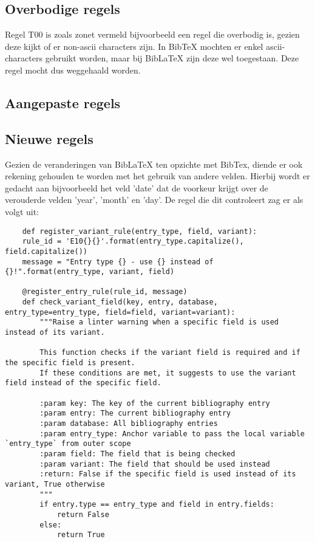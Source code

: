 \subsection{Overbodige regels}
Regel T00 is zoals zonet vermeld bijvoorbeeld een regel die overbodig is, gezien deze kijkt of er non-ascii characters zijn. In BibTeX mochten er enkel ascii-characters gebruikt worden, maar bij BibLaTeX zijn deze wel toegestaan. Deze regel mocht dus weggehaald worden.


\subsection{Aangepaste regels}

\subsection{Nieuwe regels}
Gezien de veranderingen van BibLaTeX ten opzichte met BibTex, diende er ook rekening gehouden te worden met het gebruik van andere velden. Hierbij wordt er gedacht aan bijvoorbeeld het veld 'date' dat de voorkeur krijgt over de verouderde velden 'year', 'month' en 'day'.
De regel die dit controleert zag er als volgt uit:
\begin{verbatim}
    def register_variant_rule(entry_type, field, variant):
    rule_id = 'E10{}{}'.format(entry_type.capitalize(), field.capitalize())
    message = "Entry type {} - use {} instead of {}!".format(entry_type, variant, field)

    @register_entry_rule(rule_id, message)
    def check_variant_field(key, entry, database, entry_type=entry_type, field=field, variant=variant):
        """Raise a linter warning when a specific field is used instead of its variant.

        This function checks if the variant field is required and if the specific field is present.
        If these conditions are met, it suggests to use the variant field instead of the specific field.

        :param key: The key of the current bibliography entry
        :param entry: The current bibliography entry
        :param database: All bibliography entries
        :param entry_type: Anchor variable to pass the local variable `entry_type` from outer scope
        :param field: The field that is being checked
        :param variant: The field that should be used instead
        :return: False if the specific field is used instead of its variant, True otherwise
        """
        if entry.type == entry_type and field in entry.fields:
            return False
        else:
            return True
\end{verbatim}

